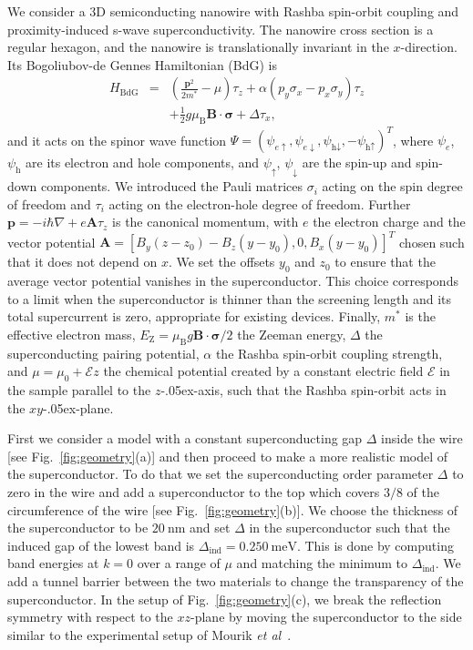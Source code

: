 We consider a 3D semiconducting nanowire with Rashba spin-orbit coupling and proximity-induced s-wave superconductivity.
The nanowire cross section is a regular hexagon, and the nanowire is translationally invariant in the $x$-direction.
Its Bogoliubov-de Gennes Hamiltonian (BdG) is
\begin{eqnarray}
H_\textrm{BdG} & = & \left(\frac{\bm{p}^{2}}{2m^*}-\mu\right)\tau_z+\alpha\left(p_{y}\sigma_x -p_{x}\sigma_y \right)\tau_z\nonumber \\
 &  & +\frac{1}{2}g\mu_\textrm{B}\bm{B}\cdot\boldsymbol{\sigma}+\Delta\tau_x,\label{eq:H_BdG}
\end{eqnarray}
and it acts on the spinor wave function $\Psi={\left(\psi_{e\uparrow},\psi_{e\downarrow},\psi_{\textrm{h}\downarrow},-\psi_{\textrm{h}\uparrow}\right)}^{T}$, where $\psi_e$, $\psi_\textrm{h}$ are its electron and hole components, and $\psi_\uparrow$, $\psi_\downarrow$ are the spin-up and spin-down components.
We introduced the Pauli matrices $\sigma_{i}$ acting on the spin degree of freedom and $\tau_{i}$ acting on the electron-hole degree of freedom.
Further $\bm{p}=-i\hbar\nabla+e\bm{A}\tau_z$ is the canonical momentum, with $e$ the electron charge and the vector potential $\bm{A}={\left[ B_y (z - z_0) - B_z (y - y_0), 0, B_x (y - y_0)\right]}^{T}$ chosen such that it does not depend on $x$.
We set the offsets $y_0$ and $z_0$ to ensure that the average vector potential vanishes in the superconductor.
This choice corresponds to a limit when the superconductor is thinner than the screening length and its total supercurrent is zero, appropriate for existing devices.
Finally, $m^*$ is the effective electron mass, $E_\textrm{Z}=\mu_\textrm{B}g\bm{B}\cdot\boldsymbol{\sigma}/2$ the Zeeman energy,  $\Delta$ the superconducting pairing potential, $\alpha$ the Rashba spin-orbit coupling strength, and $\mu=\mu_0+\mathcal{E} z$ the chemical potential created by a constant electric field $\mathcal{E}$ in the sample parallel to the $z$\kern-.05ex-axis, such that the Rashba spin-orbit acts in the $xy$\kern-.05ex-plane.


First we consider a model with a constant superconducting gap $\Delta$ inside the wire [see Fig.~\ref{fig:geometry}(a)] and then proceed to make a more realistic model of the superconductor.
To do that we set the superconducting order parameter $\Delta$ to zero in the wire and add a superconductor to the top which covers $3/8$ of the circumference of the wire [see Fig.~\ref{fig:geometry}(b)].
We choose the thickness of the superconductor to be $\SI{20}{\nano\metre}$ and set $\Delta$ in the superconductor such that the induced gap of the lowest band is $\Delta_\textrm{ind}=\SI{0.250}{\milli\electronvolt}$.
This is done by computing band energies at $k=0$ over a range of $\mu$ and matching the minimum to $\Delta_\textrm{ind}$.
We add a tunnel barrier between the two materials to change the transparency of the superconductor.
In the setup of Fig.~\ref{fig:geometry}(c), we break the reflection symmetry with respect to the $xz$-plane by moving the superconductor to the side similar to the experimental setup of Mourik \emph{et al}~\cite{Mourik2012}.

